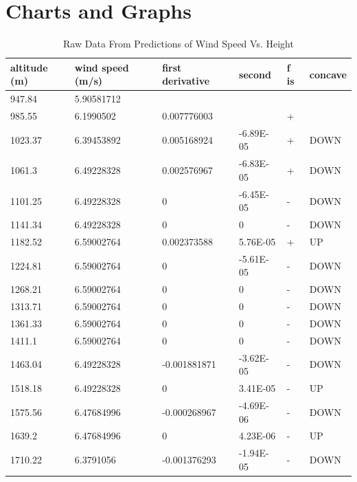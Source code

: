 \documentclass{article}
\begin{document}
\section{Charts and Graphs}
\begin{table}[]
\centering
\caption{Raw Data From Predictions of Wind Speed Vs. Height}
\label{joshtable1}
\begin{tabular}{@{}llllll@{}}
\toprule
altitude (m) & wind speed (m/s) & first derivative & second    & f is & concave \\ \midrule
947.84       & 5.90581712       &                  &           &      &         \\
985.55       & 6.1990502        & 0.007776003      &           & +    &         \\
1023.37      & 6.39453892       & 0.005168924      & -6.89E-05 & +    & DOWN    \\
1061.3       & 6.49228328       & 0.002576967      & -6.83E-05 & +    & DOWN    \\
1101.25      & 6.49228328       & 0                & -6.45E-05 & -    & DOWN    \\
1141.34      & 6.49228328       & 0                & 0         & -    & DOWN    \\
1182.52      & 6.59002764       & 0.002373588      & 5.76E-05  & +    & UP      \\
1224.81      & 6.59002764       & 0                & -5.61E-05 & -    & DOWN    \\
1268.21      & 6.59002764       & 0                & 0         & -    & DOWN    \\
1313.71      & 6.59002764       & 0                & 0         & -    & DOWN    \\
1361.33      & 6.59002764       & 0                & 0         & -    & DOWN    \\
1411.1       & 6.59002764       & 0                & 0         & -    & DOWN    \\
1463.04      & 6.49228328       & -0.001881871     & -3.62E-05 & -    & DOWN    \\
1518.18      & 6.49228328       & 0                & 3.41E-05  & -    & UP      \\
1575.56      & 6.47684996       & -0.000268967     & -4.69E-06 & -    & DOWN    \\
1639.2       & 6.47684996       & 0                & 4.23E-06  & -    & UP      \\
1710.22      & 6.3791056        & -0.001376293     & -1.94E-05 & -    & DOWN    \\

\end{tabular}
\end{table}
\end{document}
